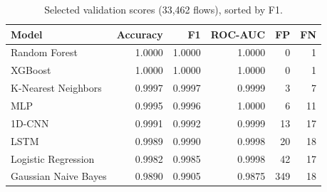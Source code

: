 \begin{table}[htb]
\centering
\caption{Selected validation scores (33,462 flows), sorted by F1.}\label{tab:val}
\begin{tabular}{lrrrrr}
\toprule
Model & Accuracy & F1 & ROC-AUC & FP & FN \\
\midrule
Random Forest & 1.0000 & 1.0000 & 1.0000 & 0 & 1 \\
XGBoost & 1.0000 & 1.0000 & 1.0000 & 0 & 1 \\
K-Nearest Neighbors & 0.9997 & 0.9997 & 0.9999 & 3 & 7 \\
MLP & 0.9995 & 0.9996 & 1.0000 & 6 & 11 \\
1D-CNN & 0.9991 & 0.9992 & 0.9999 & 13 & 17 \\
LSTM & 0.9989 & 0.9990 & 0.9998 & 20 & 18 \\
Logistic Regression & 0.9982 & 0.9985 & 0.9998 & 42 & 17 \\
Gaussian Naive Bayes & 0.9890 & 0.9905 & 0.9875 & 349 & 18 \\
\bottomrule
\end{tabular}
\end{table}

